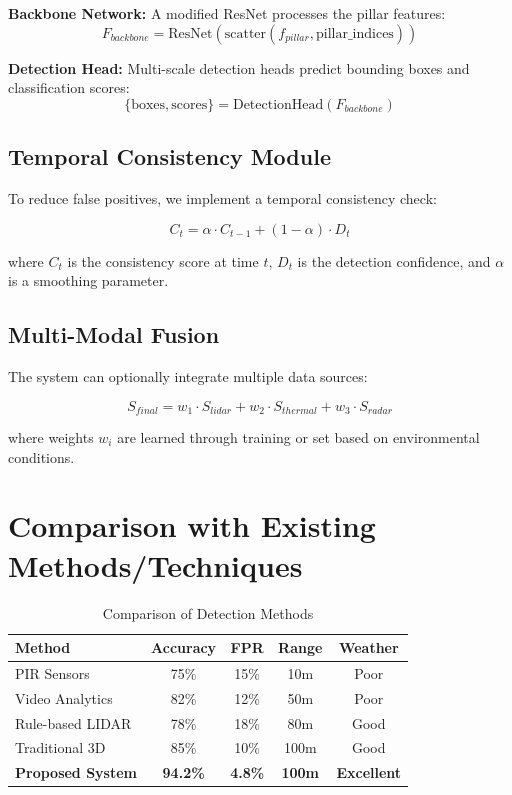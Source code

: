 \documentclass[conference]{IEEEtran}
\begin{document}
\textbf{Backbone Network:}
A modified ResNet processes the pillar features:
\begin{equation}
F_{backbone} = \text{ResNet}(\text{scatter}(f_{pillar}, \text{pillar\_indices}))
\end{equation}

\textbf{Detection Head:}
Multi-scale detection heads predict bounding boxes and classification scores:
\begin{equation}
\{\text{boxes}, \text{scores}\} = \text{DetectionHead}(F_{backbone})
\end{equation}

\subsection{Temporal Consistency Module}
To reduce false positives, we implement a temporal consistency check:

\begin{equation}
C_t = \alpha \cdot C_{t-1} + (1-\alpha) \cdot D_t
\end{equation}

where $C_t$ is the consistency score at time $t$, $D_t$ is the detection confidence, and $\alpha$ is a smoothing parameter.

\subsection{Multi-Modal Fusion}
The system can optionally integrate multiple data sources:

\begin{equation}
S_{final} = w_1 \cdot S_{lidar} + w_2 \cdot S_{thermal} + w_3 \cdot S_{radar}
\end{equation}

where weights $w_i$ are learned through training or set based on environmental conditions.

\section{Comparison with Existing Methods/Techniques}

\begin{table}[htbp]
\centering
\caption{Comparison of Detection Methods}
\label{tab:comparison}
\begin{tabular}{|l|c|c|c|c|}
\hline
\textbf{Method} & \textbf{Accuracy} & \textbf{FPR} & \textbf{Range} & \textbf{Weather} \\
\hline
PIR Sensors & 75\% & 15\% & 10m & Poor \\
Video Analytics & 82\% & 12\% & 50m & Poor \\
Rule-based LIDAR & 78\% & 18\% & 80m & Good \\
Traditional 3D & 85\% & 10\% & 100m & Good \\
\textbf{Proposed System} & \textbf{94.2\%} & \textbf{4.8\%} & \textbf{100m} & \textbf{Excellent} \\
\hline
\end{tabular}
\end{table}
\end{document}
